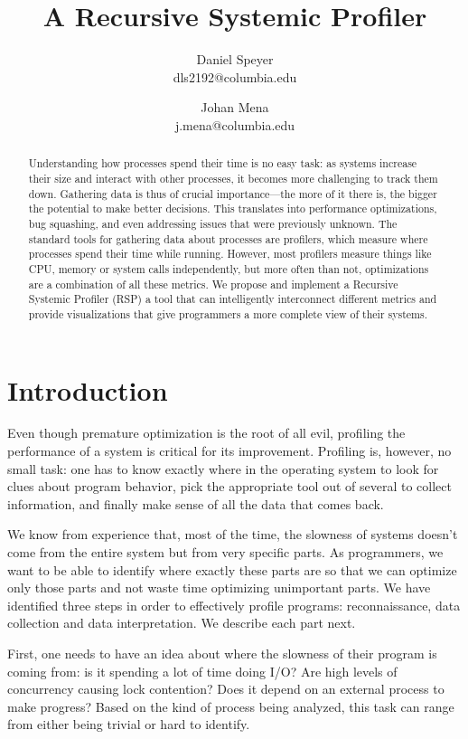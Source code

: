 \documentclass[10pt]{article}
\author{Daniel Speyer\\dls2192@columbia.edu \and Johan Mena\\j.mena@columbia.edu}
\title{\textbf{A Recursive Systemic Profiler}}
\date{}
\begin{document}
\maketitle

\begin{abstract}

Understanding how processes spend their time is no easy task: as systems
increase their size and interact with other processes, it becomes more
challenging to track them down. Gathering data is thus of crucial
importance---the more of it there is, the bigger the potential to make better
decisions.  This translates into performance optimizations, bug squashing, and
even addressing issues that were previously unknown. The standard tools for
gathering data about processes are profilers, which measure where processes
spend their time while running. However, most profilers measure things like
CPU, memory or system calls independently, but more often than not,
optimizations are a combination of all these metrics. We propose and implement
a Recursive Systemic Profiler (RSP) a tool that can intelligently interconnect
different metrics and provide visualizations that give programmers a more
complete view of their systems.

\end{abstract}

\section{Introduction}
Even though premature optimization is the root of all evil, profiling the
performance of a system is critical for its improvement. Profiling is, however,
no small task: one has to know exactly where in the operating system to look for
clues about program behavior, pick the appropriate tool out of several to collect
information, and finally make sense of all the data that comes back.

We know from experience that, most of the time, the slowness of systems doesn't
come from the entire system but from very specific parts. As programmers, we want
to be able to identify where exactly these parts are so that we can optimize only
those parts and not waste time optimizing unimportant parts. We have identified
three steps in order to effectively profile programs: reconnaissance, data
collection and data interpretation. We describe each part next.

First, one needs to have an idea about where the slowness of their program is
coming from: is it spending a lot of time doing I/O? Are high levels of
concurrency causing lock contention? Does it depend on an external process to
make progress? Based on the kind of process being analyzed, this task can range
from either being trivial or hard to identify.
\end{document}
